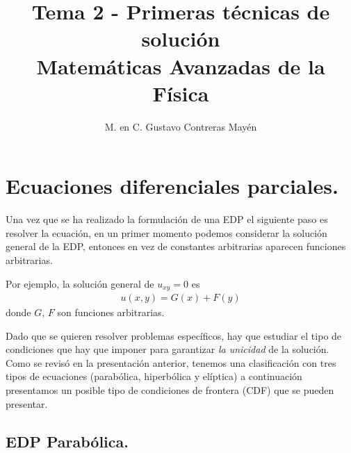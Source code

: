 
\title{Tema 2 - Primeras técnicas de solución \\[0.3em]  \large{Matemáticas Avanzadas de la Física}\vspace{-3ex}}
\author{M. en C. Gustavo Contreras Mayén}
\date{ }

\pagestyle{fancy}
\fancyhf{}
\lhead{\leftmark}
\rfoot{\thepage}
\setlength{\headheight}{16pt}%


\vspace{-4cm}
\maketitle
\fontsize{14}{14}\selectfont
\tableofcontents
\newpage

\section{Ecuaciones diferenciales parciales.}

Una vez que se ha realizado la formulación de una EDP el siguiente paso es resolver la ecuación, en un primer momento podemos considerar la solución general de la EDP, entonces en vez de constantes arbitrarias aparecen funciones arbitrarias.
\par
Por ejemplo, la solución general de $u_{xy} = 0$ es 
\begin{align*}
u(x, y) = G(x) + F (y)
\end{align*}
donde $G$, $F$ son funciones arbitrarias.
\par
Dado que se quieren resolver problemas específicos, hay que estudiar el tipo de condiciones que hay que imponer para garantizar \emph{la unicidad} de la solución. Como se revisó en la presentación anterior, tenemos una clasificación con tres tipos de ecuaciones (parabólica, hiperbólica y elíptica) a continuación presentamos un posible tipo de condiciones de frontera (CDF) que se pueden presentar.

\subsection{EDP Parabólica.}

